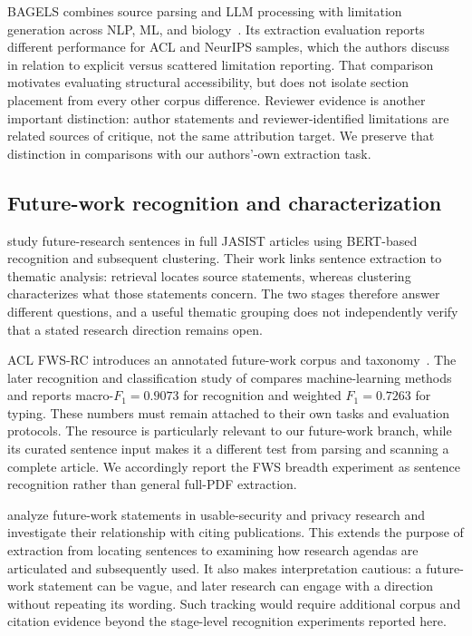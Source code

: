 BAGELS combines source parsing and LLM processing with limitation generation across NLP, ML, and
biology~\citep{alazher2025bagels}. Its extraction evaluation reports different performance for
ACL and NeurIPS samples, which the authors discuss in relation to explicit versus scattered
limitation reporting. That comparison motivates evaluating structural accessibility, but does not
isolate section placement from every other corpus difference. Reviewer evidence is another
important distinction: author statements and reviewer-identified limitations are related sources
of critique, not the same attribution target. We preserve that distinction in comparisons with
our authors'-own extraction task.

\subsection{Future-work recognition and characterization}
\label{S:rw-future}

\citet{zhu2019recognizing} study future-research sentences in full JASIST articles using BERT-based
recognition and subsequent clustering. Their work links sentence extraction to thematic analysis:
retrieval locates source statements, whereas clustering characterizes what those statements concern.
The two stages therefore answer different questions, and a useful thematic grouping does not
independently verify that a stated research direction remains open.

ACL FWS-RC introduces an annotated future-work corpus and taxonomy~\citep{hao2020acl}.
The later recognition and classification study of \citet{zhang2023fws} compares machine-learning
methods and reports macro-$F_1=0.9073$ for recognition and weighted $F_1=0.7263$ for typing.
These numbers must remain attached to their own tasks and evaluation protocols. The resource is
particularly relevant to our future-work branch, while its curated sentence input makes it a
different test from parsing and scanning a complete article. We accordingly report the FWS
breadth experiment as sentence recognition rather than general full-PDF extraction.

\citet{suray2024future} analyze future-work statements in usable-security and privacy research and
investigate their relationship with citing publications. This extends the purpose of extraction
from locating sentences to examining how research agendas are articulated and subsequently used.
It also makes interpretation cautious: a future-work statement can be vague, and later research
can engage with a direction without repeating its wording. Such tracking would require additional
corpus and citation evidence beyond the stage-level recognition experiments reported here.

